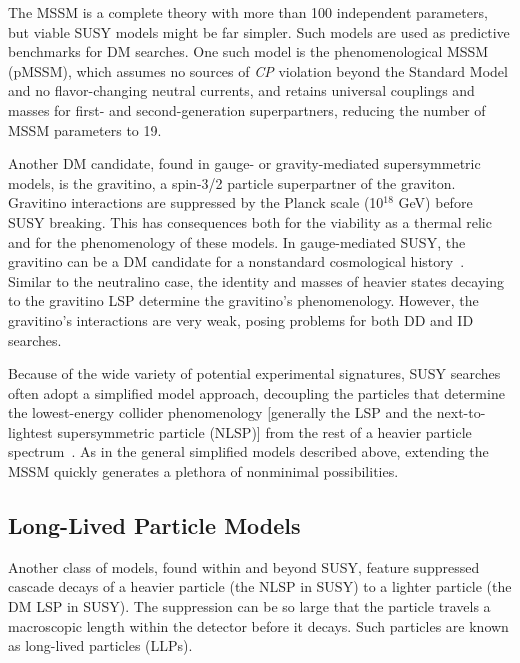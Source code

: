 \documentclass{ar-1col}
\begin{document}
{The MSSM is a complete theory with more than 100 independent
parameters, but viable SUSY models might be far simpler. Such
models are used as predictive benchmarks for DM searches. One such model is the phenomenological MSSM (pMSSM), which assumes no
sources of \textit{CP} violation beyond the Standard Model and no flavor-changing neutral
currents, and retains universal couplings and masses for first- and
second-generation superpartners, reducing the number of MSSM
parameters to 19. 

Another DM candidate, found in gauge- or gravity-mediated supersymmetric
models, is the gravitino, a spin-3/2 particle superpartner of the
graviton. Gravitino interactions are suppressed by the Planck
scale (10$^{18}$ GeV) before SUSY breaking. This has consequences
both for the viability as a thermal relic and for the
phenomenology of these models. In gauge-mediated SUSY, the gravitino can be a DM
candidate for a nonstandard cosmological
history~\cite{Dimopoulos:1996vz}. Similar to the neutralino case,
the identity and masses of heavier states decaying to the
gravitino LSP determine the gravitino's phenomenology. However, the gravitino's
interactions are very weak, posing problems for both DD and
ID searches.

Because of the wide variety of potential experimental signatures,
SUSY searches often adopt a simplified model approach,
decoupling the particles that determine the lowest-energy collider
phenomenology [generally the LSP and the next-to-lightest supersymmetric particle (NLSP)] from the rest of a heavier
particle spectrum~\cite{Alves:2011wf}. 
As in the general simplified models described above, extending the MSSM quickly
generates a plethora of nonminimal possibilities.

\subsection{Long-Lived Particle Models}\label{sec:LLPModels}

Another class of models, found within and beyond SUSY, feature suppressed cascade decays of a heavier particle (the NLSP
in SUSY) to a lighter particle (the DM LSP in SUSY). The
suppression can be so large that the particle travels a
macroscopic length within the detector before it decays. Such particles are known as long-lived particles (LLPs).

}
\end{document}
